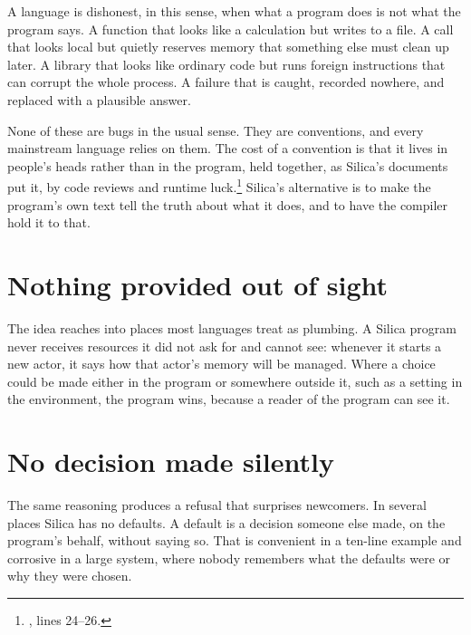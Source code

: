 
A language is dishonest, in this sense, when what a program does is not what
the program says. A function that looks like a calculation but writes to a
file. A call that looks local but quietly reserves memory that something else
must clean up later. A library that looks like ordinary code but runs foreign
instructions that can corrupt the whole process. A failure that is caught,
recorded nowhere, and replaced with a plausible answer.

None of these are bugs in the usual sense. They are conventions, and every
mainstream language relies on them. The cost of a convention is that it lives
in people's heads rather than in the program, held together, as Silica's
documents put it, by code reviews and runtime luck.\footnote{, lines 24--26.} Silica's alternative is to make the program's
own text tell the truth about what it does, and to have the compiler hold it to
that.


\section{Nothing provided out of sight}

The idea reaches into places most languages treat as plumbing. A Silica
program never receives resources it did not ask for and cannot see: whenever
it starts a new actor, it says how that actor's memory will be managed. Where a
choice could be made either in the program or somewhere outside it, such as a
setting in the environment, the program wins, because a reader of the program
can see it.

\section{No decision made silently}

The same reasoning produces a refusal that surprises newcomers. In several
places Silica has no defaults. A default is a decision someone else made, on
the program's behalf, without saying so. That is convenient in a ten-line
example and corrosive in a large system, where nobody remembers what the
defaults were or why they were chosen.


